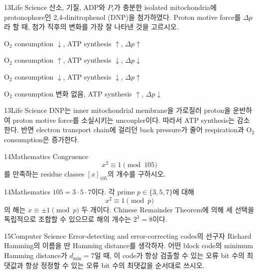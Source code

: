 \documentclass[12pt,aspectratio=169]{beamer}
\begin{document}
\begin{problemframe}{13}{Life Science}
산소, 기질, ADP와 $P_i$가 충분한 isolated mitochondria에 protonophore인 2,4-dinitrophenol (DNP)을 첨가하였다. Proton motive force를 $\Delta p$라 할 때, 첨가 직후의 변화를 가장 잘 나타낸 것을 고르시오.
\begin{simchoices}
\item $\mathrm{O_2}$ consumption $\downarrow$, ATP synthesis $\uparrow$, $\Delta p\uparrow$
\item $\mathrm{O_2}$ consumption $\uparrow$, ATP synthesis $\downarrow$, $\Delta p\downarrow$
\item $\mathrm{O_2}$ consumption $\downarrow$, ATP synthesis $\downarrow$, $\Delta p\uparrow$
\item $\mathrm{O_2}$ consumption 변화 없음, ATP synthesis $\uparrow$, $\Delta p\downarrow$
\end{simchoices}
\end{problemframe}

\begin{solutionframe}{13}{Life Science}
DNP는 inner mitochondrial membrane을 가로질러 proton을 운반하여 proton motive force를 소실시키는 uncoupler이다. 따라서 ATP synthesis는 감소한다. 반면 electron transport chain에 걸리던 back pressure가 줄어 respiration과 $\mathrm{O_2}$ consumption은 증가한다.
\end{solutionframe}

\begin{problemframe}{14}{Mathematics}
Congruence
\[
x^2\equiv1\pmod{105}
\]
를 만족하는 residue classes $[x]_{105}$의 개수를 구하시오.
\end{problemframe}

\begin{solutionframe}{14}{Mathematics}
$105=3\cdot5\cdot7$이다. 각 prime $p\in\{3,5,7\}$에 대해
\[
x^2\equiv1\pmod p
\]
의 해는 $x\equiv\pm1\pmod p$ 두 개이다. Chinese Remainder Theorem에 의해 세 선택을 독립적으로 조합할 수 있으므로 해의 개수는 $2^3=8$이다.
\end{solutionframe}

\begin{problemframe}{15}{Computer Science}
Error-detecting and error-correcting codes의 선구자 Richard Hamming의 이름을 딴 Hamming distance를 생각하자. 어떤 block code의 minimum Hamming distance가 $d_{\min}=7$일 때, 이 code가 항상 검출할 수 있는 오류 bit 수의 최댓값과 항상 정정할 수 있는 오류 bit 수의 최댓값을 순서대로 쓰시오.
\end{problemframe}
\end{document}
